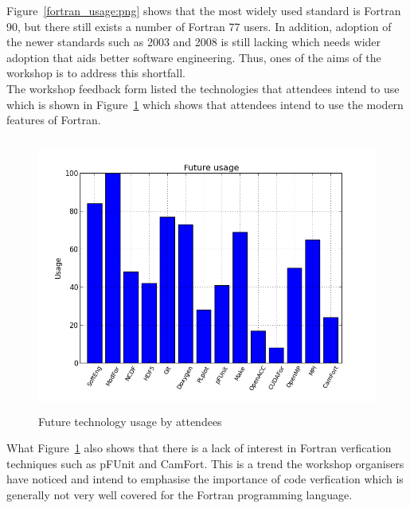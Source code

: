 \documentclass[12pt]{article}
\begin{document}
Figure~\ref{fortran_usage:png} shows that the most widely used standard is Fortran 90, but there still exists a number of
Fortran 77 users. In addition, adoption of the newer standards such as 2003 and 2008 is still lacking which needs wider
adoption that aids better software engineering. Thus, ones of the aims of the workshop is to address this shortfall. \\

The workshop feedback form listed the technologies that attendees intend to use which is shown in Figure~\ref{future:png}
which shows that attendees intend to use the modern features of Fortran.
\begin{figure}[H]
\begin{center}
\includegraphics[width=13cm,height=9cm]{future.png}
\caption{Future technology usage by attendees}\label{future:png}
\end{center}
\end{figure}
What Figure~\ref{future:png} also shows that there is a lack of interest in Fortran verfication techniques such as
pFUnit and CamFort. This is a trend the workshop organisers have noticed and intend to emphasise the importance
of code verfication which is generally not very well covered for the Fortran programming language. 
\end{document}
